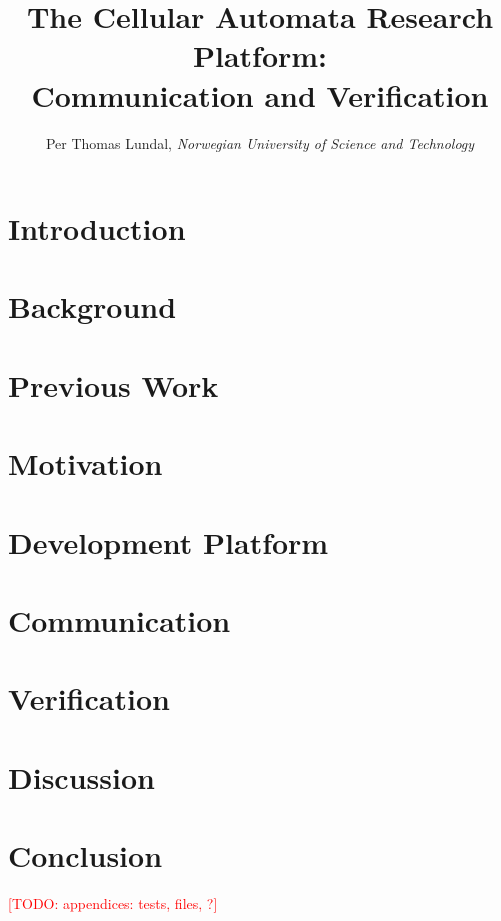 \documentclass[a4paper]{IEEEtran}
\title{The Cellular Automata Research Platform: \\ Communication and Verification}
\author{Per Thomas Lundal, \emph{Norwegian University of Science and Technology}}
\newcommand\todo[1]{\textcolor{red}{[TODO: #1]}}
\begin{document}
\maketitle

\begin{abstract}

    

\end{abstract}

\section{Introduction}

    

\section{Background}
    \label{sec:background}
    

\section{Previous Work}
    \label{sec:previous-work}
    

\section{Motivation}
    \label{sec:motivation}
    

\section{Development Platform}
    \label{sec:development}
    

\section{Communication}
    \label{sec:communication}
    

\section{Verification}
    \label{sec:verification}
    

\section{Discussion}
    \label{sec:discussion}
    

\section{Conclusion}
    \label{sec:conclusion}
    




\todo{appendices: tests, files, ?}
\end{document}
